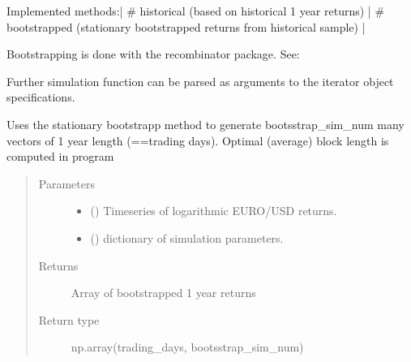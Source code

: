 \documentclass[a4paper,11pt,english]{sphinxmanual}
\begin{document}
\sphinxAtStartPar
Implemented methods:|
\# historical (based on historical 1 year returns) |
\# bootstrapped (stationary bootstrapped returns from historical sample) |

\sphinxAtStartPar
Bootstrapping is done with the recombinator package.
See: 

\sphinxAtStartPar
Further simulation function can be parsed as arguments to the iterator object
specifications.

\begin{fulllineitems}
\label{\detokenize{simulation:src.simulation.task_simulate_sample.generate_bootstrapped_returns}}
\sphinxAtStartPar
Uses the stationary bootstrapp method
to generate bootsstrap\_sim\_num many vectors
of 1 year length (==trading days). Optimal (average)
block length is computed in program
\begin{quote}\begin{description}
\item[{Parameters}] \leavevmode\begin{itemize}
\item {} 
\sphinxAtStartPar
{} (\sphinxstyleliteralemphasis{\sphinxupquote{(}}\sphinxstyleliteralemphasis{\sphinxupquote{,}}\sphinxstyleliteralemphasis{\sphinxupquote{)}}) \textendash{} Timeseries of logarithmic EURO/USD returns.

\item {} 
\sphinxAtStartPar
{} () \textendash{} dictionary of simulation parameters.

\end{itemize}

\item[{Returns}] \leavevmode
\sphinxAtStartPar
Array of bootstrapped 1 year returns

\item[{Return type}] \leavevmode
\sphinxAtStartPar
np.array(trading\_days, bootsstrap\_sim\_num)

\end{description}\end{quote}

\end{fulllineitems}
\end{document}
